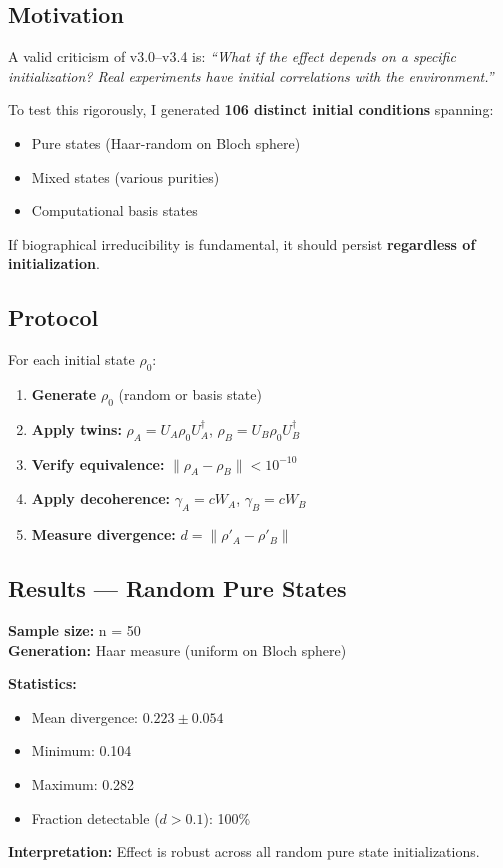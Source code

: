 \documentclass[11pt, onecolumn, letterpaper]{article}
\begin{document}
\subsection{Motivation}
A valid criticism of v3.0--v3.4 is: \textit{``What if the effect depends on a specific initialization? Real experiments have initial correlations with the environment.''}

To test this rigorously, I generated \textbf{106 distinct initial conditions} spanning:
\begin{itemize}
    \item Pure states (Haar-random on Bloch sphere)
    \item Mixed states (various purities)
    \item Computational basis states
\end{itemize}
If biographical irreducibility is fundamental, it should persist \textbf{regardless of initialization}.

\subsection{Protocol}
For each initial state $\rho_0$:
\begin{enumerate}
    \item \textbf{Generate} $\rho_0$ (random or basis state)
    \item \textbf{Apply twins:} $\rho_A = U_A \rho_0 U_A^\dagger$, $\rho_B = U_B \rho_0 U_B^\dagger$
    \item \textbf{Verify equivalence:} $\|\rho_A - \rho_B\| < 10^{-10}$
    \item \textbf{Apply decoherence:} $\gamma_A = c W_A$, $\gamma_B = c W_B$
    \item \textbf{Measure divergence:} $d = \|\rho'_A - \rho'_B\|$
\end{enumerate}

\subsection{Results --- Random Pure States}
\textbf{Sample size:} n = 50 \\
\textbf{Generation:} Haar measure (uniform on Bloch sphere)

\textbf{Statistics:}
\begin{itemize}
    \item Mean divergence: $0.223 \pm 0.054$
    \item Minimum: 0.104
    \item Maximum: 0.282
    \item Fraction detectable ($d > 0.1$): 100\%
\end{itemize}
\textbf{Interpretation:} Effect is robust across all random pure state initializations.
\end{document}
